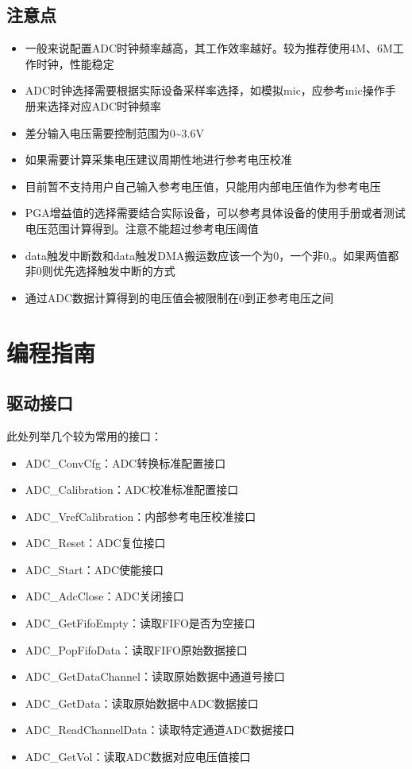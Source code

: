 \documentclass[
  12pt,
]{book}
\begin{document}
\hypertarget{ux6ce8ux610fux70b9}{%
\subsection{注意点}\label{ux6ce8ux610fux70b9}}

\begin{itemize}
\item
  一般来说配置ADC时钟频率越高，其工作效率越好。较为推荐使用4M、6M工作时钟，性能稳定
\item
  ADC时钟选择需要根据实际设备采样率选择，如模拟mic，应参考mic操作手册来选择对应ADC时钟频率
\item
  差分输入电压需要控制范围为0\textasciitilde3.6V
\item
  如果需要计算采集电压建议周期性地进行参考电压校准
\item
  目前暂不支持用户自己输入参考电压值，只能用内部电压值作为参考电压
\item
  PGA增益值的选择需要结合实际设备，可以参考具体设备的使用手册或者测试电压范围计算得到。注意不能超过参考电压阈值
\item
  data触发中断数和data触发DMA搬运数应该一个为0，一个非0,。如果两值都非0则优先选择触发中断的方式
\item
  通过ADC数据计算得到的电压值会被限制在0到正参考电压之间
\end{itemize}

\hypertarget{ux7f16ux7a0bux6307ux5357}{%
\section{编程指南}\label{ux7f16ux7a0bux6307ux5357}}

\hypertarget{ux9a71ux52a8ux63a5ux53e3}{%
\subsection{驱动接口}\label{ux9a71ux52a8ux63a5ux53e3}}

此处列举几个较为常用的接口：

\begin{itemize}
\item
  ADC\_ConvCfg：ADC转换标准配置接口
\item
  ADC\_Calibration：ADC校准标准配置接口
\item
  ADC\_VrefCalibration：内部参考电压校准接口
\item
  ADC\_Reset：ADC复位接口
\item
  ADC\_Start：ADC使能接口
\item
  ADC\_AdcClose：ADC关闭接口
\item
  ADC\_GetFifoEmpty：读取FIFO是否为空接口
\item
  ADC\_PopFifoData：读取FIFO原始数据接口
\item
  ADC\_GetDataChannel：读取原始数据中通道号接口
\item
  ADC\_GetData：读取原始数据中ADC数据接口
\item
  ADC\_ReadChannelData：读取特定通道ADC数据接口
\item
  ADC\_GetVol：读取ADC数据对应电压值接口
\end{itemize}
\end{document}
